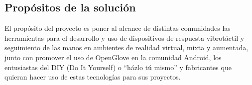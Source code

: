 \subsection{Propósitos de la solución}
El propósito del proyecto es poner al alcance de distintas comunidades las herramientas para el desarrollo y uso de dispositivos de respuesta vibrotáctil y seguimiento de las manos en ambientes de realidad virtual, mixta y aumentada, junto con promover el uso de OpenGlove en la comunidad Android, los entusiastas del DIY (Do It Yourself)  o ``házlo tú mismo'' y fabricantes que quieran hacer uso de estas tecnologías para sus proyectos.